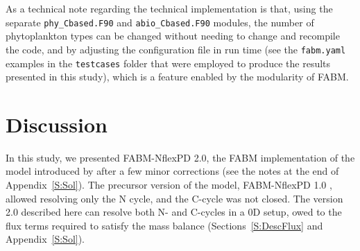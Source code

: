 \documentclass[gmd, manuscript]{copernicus}
\newcommand{\onur}[1]{\textcolor{blue}{\{Onur: #1\}}}
\begin{document}

As a technical note regarding the technical implementation is that, using the separate \verb|phy_Cbased.F90| and \verb|abio_Cbased.F90| modules, the number of phytoplankton types can be changed without needing to change and recompile the code, and by adjusting the configuration file in run time (see the \verb|fabm.yaml| examples in the \verb|testcases| folder that were employed to produce the results presented in this study), which is a feature enabled by the modularity of FABM.


%

\FloatBarrier
\section{Discussion}

In this study, we presented FABM-NflexPD 2.0, the FABM implementation of the model introduced by \citet{Smith2016} after a few minor corrections (see the notes at the end of Appendix~\ref{S:Sol}). The precursor version of the model, FABM-NflexPD 1.0 \citep{Kerimoglu2021}, allowed resolving only the N cycle, and the C-cycle was not closed. The version 2.0 described here can resolve both N- and C-cycles in a 0D setup, owed to the flux terms required to satisfy the mass balance (Sections~\ref{S:DescFlux} and Appendix~\ref{S:Sol}). 
\end{document}
